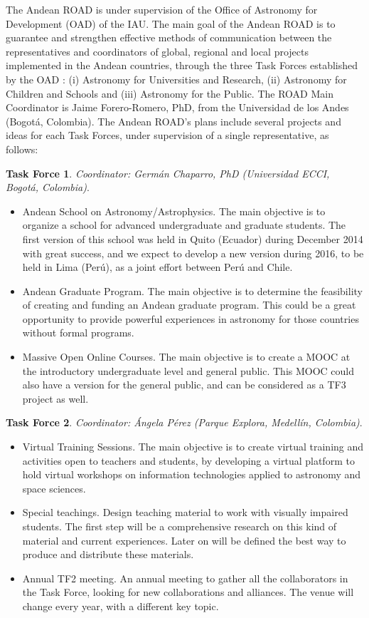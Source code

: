\documentclass{iau_FM}
\begin{document}
The Andean ROAD is under supervision of the Office of Astronomy for
Development (OAD) of the IAU. 
The main goal of the Andean ROAD is to guarantee and strengthen
effective methods of communication between the representatives and
coordinators of global, regional and local projects implemented in the
Andean countries, through the three Task Forces established by the OAD
: (i) Astronomy for Universities and Research, (ii) Astronomy for
Children and Schools and (iii) Astronomy for the Public. 
The ROAD Main Coordinator is Jaime Forero-Romero, PhD, from the
Universidad de los Andes (Bogot\'a, Colombia). 
The Andean ROAD's plans include several projects and ideas for each
Task Forces, under supervision of a single representative, as follows:  

\textbf{Task Force 1}. \textit{Coordinator: Germ\'an Chaparro, PhD
  (Universidad ECCI, Bogot\'a, Colombia)}. 

\begin{itemize}
\item Andean School on Astronomy/Astrophysics. The main objective is to
organize a school for advanced undergraduate  and graduate
students. The first version of this school was held in Quito (Ecuador)
during December 2014 with great success, and we expect to develop a
new version during 2016, to be held in Lima (Per\'u), as a joint
effort between Per\'u and Chile. 

\item Andean Graduate Program. The main objective is to determine the
feasibility of creating and funding an Andean graduate program. This
could be a great opportunity to provide powerful experiences in
astronomy for those countries without formal programs. 

\item Massive Open Online Courses. The main objective is to create a MOOC
at the introductory undergraduate level and general public. This MOOC
could also have a version for the general public, and can be
considered as a TF3 project as well.
\end{itemize}

\textbf{Task Force 2}. \textit{Coordinator: \'Angela P\'erez (Parque
  Explora, Medell\'in, Colombia)}.
\begin{itemize}
\item Virtual Training Sessions. The main objective is to create virtual
training and activities open to teachers and students, by developing a
virtual platform to hold virtual workshops on information technologies
applied to astronomy and space sciences. 

\item Special teachings. Design teaching material to work with visually
impaired students. The first step will be a comprehensive research on
this kind of material and current experiences. Later on will be
defined the best way to produce and distribute these materials. 

\item Annual TF2 meeting. An annual meeting to gather all the
collaborators in the Task Force, looking for new collaborations and
alliances. The venue will change every year, with a different key
topic. 
\end{itemize}
\end{document}
